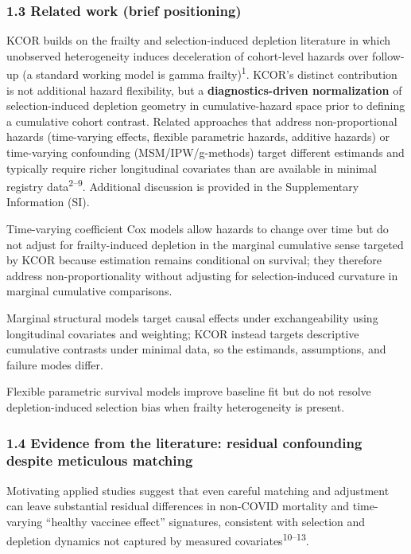 \documentclass[
]{article}
\begin{document}
\subsubsection{1.3 Related work (brief positioning)}\label{related-work-brief-positioning}

KCOR builds on the frailty and selection-induced depletion literature in which unobserved heterogeneity induces deceleration of cohort-level hazards over follow-up (a standard working model is gamma frailty)\textsuperscript{1}. KCOR's distinct contribution is not additional hazard flexibility, but a \textbf{diagnostics-driven normalization} of selection-induced depletion geometry in cumulative-hazard space prior to defining a cumulative cohort contrast. Related approaches that address non-proportional hazards (time-varying effects, flexible parametric hazards, additive hazards) or time-varying confounding (MSM/IPW/g-methods) target different estimands and typically require richer longitudinal covariates than are available in minimal registry data\textsuperscript{2--9}. Additional discussion is provided in the Supplementary Information (SI).

Time-varying coefficient Cox models allow hazards to change over time but do not adjust for frailty-induced depletion in the marginal cumulative sense targeted by KCOR because estimation remains conditional on survival; they therefore address non-proportionality without adjusting for selection-induced curvature in marginal cumulative comparisons.

Marginal structural models target causal effects under exchangeability using longitudinal covariates and weighting; KCOR instead targets descriptive cumulative contrasts under minimal data, so the estimands, assumptions, and failure modes differ.

Flexible parametric survival models improve baseline fit but do not resolve depletion-induced selection bias when frailty heterogeneity is present.

\subsubsection{1.4 Evidence from the literature: residual confounding despite meticulous matching}\label{evidence-from-the-literature-residual-confounding-despite-meticulous-matching}

Motivating applied studies suggest that even careful matching and adjustment can leave substantial residual differences in non-COVID mortality and time-varying ``healthy vaccinee effect'' signatures, consistent with selection and depletion dynamics not captured by measured covariates\textsuperscript{10--13}.
\end{document}
